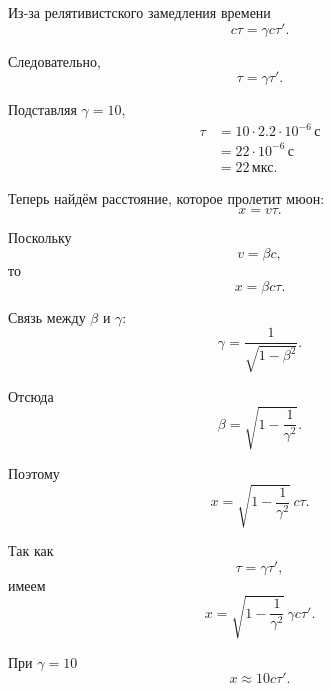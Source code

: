 \documentclass[../final.tex]{subfiles}
\begin{document}
Из-за релятивистского замедления времени
%
\begin{equation*}
    c\tau
    =
    \gamma c\tau'.
\end{equation*}

Следовательно,
%
\begin{equation*}
    \tau
    =
    \gamma\tau'.
\end{equation*}

Подставляя $\gamma=10$,
%
\begin{align*}
    \tau
    &=
    10\cdot2.2\cdot10^{-6}\,\text{с}
    \\[3pt]
    &=
    22\cdot10^{-6}\,\text{с}
    \\[3pt]
    &=
    22\,\text{мкс}.
\end{align*}

Теперь найдём расстояние, которое пролетит мюон:
%
\begin{equation*}
    x
    =
    v\tau.
\end{equation*}

Поскольку
%
\begin{equation*}
    v=\beta c,
\end{equation*}
%
то
%
\begin{equation*}
    x
    =
    \beta c\tau.
\end{equation*}

Связь между $\beta$ и $\gamma$:
%
\begin{equation*}
    \gamma
    =
    \frac{1}{\sqrt{1-\beta^2}}.
\end{equation*}

Отсюда
%
\begin{equation*}
    \beta
    =
    \sqrt{
        1-\frac{1}{\gamma^2}
    }.
\end{equation*}

Поэтому
%
\begin{equation*}
    x
    =
    \sqrt{
        1-\frac{1}{\gamma^2}
    }\,
    c\tau.
\end{equation*}

Так как
%
\begin{equation*}
    \tau
    =
    \gamma\tau',
\end{equation*}
%
имеем
%
\begin{equation*}
    x
    =
    \sqrt{
        1-\frac{1}{\gamma^2}
    }\,
    \gamma c\tau'.
\end{equation*}

При $\gamma=10$
%
\begin{equation*}
    x
    \approx
    10c\tau'.
\end{equation*}
\end{document}
